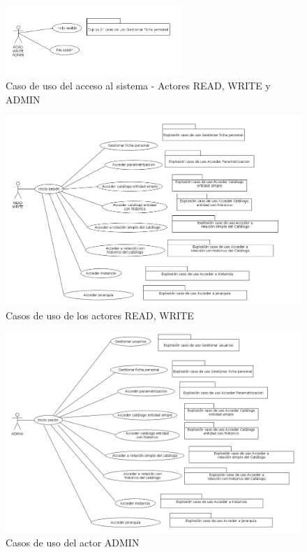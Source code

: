 \begin{figure}[H]
  \centering
  \includegraphics[width=0.6\textwidth]{imaxes/cu_acceso.png}
  \caption{Caso de uso del acceso al sistema - Actores READ, WRITE y ADMIN}
  \label{fig:cu-acceso-chap-analisis}
\end{figure}



\begin{figure}[H]
  \centering
  \includegraphics[width=\textwidth]{imaxes/cu-read-write.png}
  \caption{Casos de uso de los actores READ, WRITE}
  \label{fig:cu-read-write-chap-analisis}
\end{figure}


\begin{figure}[H]
  \centering
  \includegraphics[width=\textwidth]{imaxes/cu-admin.png}
  \caption{Casos de uso del actor ADMIN}
  \label{fig:cu-admin-chap-analisis}
\end{figure}



